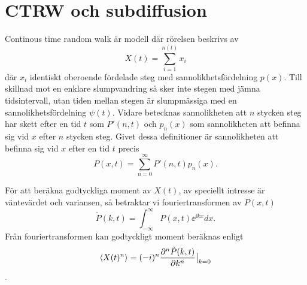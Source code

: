 \chapter{CTRW och subdiffusion}

Continous time random walk är modell där rörelsen beskrivs av 
\begin{equation}
    X(t) = \sum_{i=1}^{n(t)} x_i
\end{equation}
där $x_i$ identiskt oberoende fördelade steg med sannolikhetsfördelning $p(x)$. Till skillnad mot en enklare slumpvandring så sker inte stegen med jämna tidsintervall, utan tiden mellan stegen är slumpmässiga med en sannolikhetsfördelning $\psi (t)$. Vidare betecknas sannolikheten att $n$ stycken steg har skett efter en tid $t$ som $P'(n,t)$ och $p_n(x)$ som sannolikheten att befinna sig vid $x$ efter $n$ stycken steg. Givet dessa definitioner är sannolikheten att befinna sig vid $x$ efter en tid $t$ precis 
\begin{equation}
\label{eq:P(x,t)}
    P(x,t) =\sum_{n=0}^{\infty} P'(n,t)p_n(x).
\end{equation}

För att beräkna godtyckliga moment av $X(t)$, av speciellt intresse är väntevärdet och variansen, så betraktar vi fouriertransformen av $P(x,t)$
\begin{equation}\label{eq:four}
\tilde{P}(k,t) = \int_{-\infty}^{\infty} P(x,t)\ee^{\ii kx}dx.
\end{equation}
Från fouriertransformen kan godtyckligt moment beräknas enligt 
\begin{equation}\label{eq:moment}
\ev{X(t)^n} = (-i)^n\frac{\pd^n \tilde{P}(k,t)}{\pd k^n}\big |_{k=0}
\end{equation}. 


